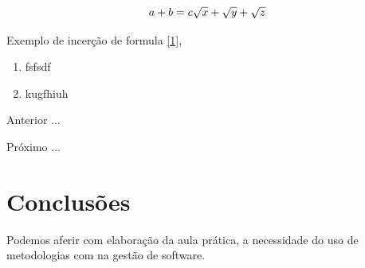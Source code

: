 \begin{equation}
  a + b = c \label{1}
  $$ $$ %
  \sqrt{x} + \sqrt{\smash[b]{y}} + \sqrt{z}
\end{equation}


\par Exemplo de incerção de formula \eqref{1},





\begin{enumerate}[label=\Roman{*}, ref=(\roman{*})]
  \item fsfsdf
  \item kugfhiuh
\end{enumerate}

\begin{asparaenum}
\item Anterior ...
\item Próximo ... \label{pl1}
\end{asparaenum}


\section{Conclusões}

\par Podemos aferir com elaboração da aula prática, a necessidade do uso de metodologias com na gestão de software.




